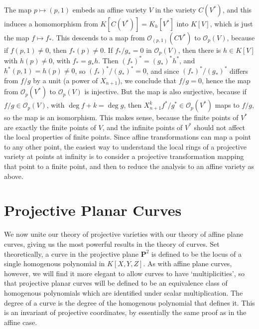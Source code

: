 The map $p \mapsto (p,1)$ embeds an affine variety $V$ in the variety $C(V^*)$, and this induces a homomorphism from $K[C(V^*)] = K_h[V^*]$ into $K[V]$, which is just the map $f \mapsto f_*$. This descends to a map from $\mathcal{O}_{(p,1)}(CV^*)$ to $\mathcal{O}_p(V)$, because if $f(p,1) \neq 0$, then $f_*(p) \neq 0$. If $f_*/g_* = 0$ in $\mathcal{O}_p(V)$, then there is $h \in K[V]$ with $h(p) \neq 0$, with $f_* = g_* h$. Then $(f_*)^* = (g_*)^* h^*$, and $h^*(p,1) = h(p) \neq 0$, so $(f_*)^*/(g_*)^* = 0$, and since $(f_*)^*/(g_*)^*$ differs from $f/g$ by a unit (a power of $X_{n+1}$), we conclude that $f/g = 0$, hence the map from $\mathcal{O}_p(V^*)$ to $\mathcal{O}_p(V)$ is injective. But the map is also surjective, because if $f/g \in \mathcal{O}_p(V)$, with $\deg f + k = \deg g$, then $X_{n+1}^k f^*/g^* \in \mathcal{O}_p(V^*)$ maps to $f/g$, so the map is an isomorphism. This makes sense, because the finite points of $V^*$ are exactly the finite points of $V$, and the infinite points of $V^*$ should not affect the local properties of finite points. Since affine transformations can map a point to any other point, the easiest way to understand the local rings of a projective variety at points at infinity is to consider a projective transformation mapping that point to a finite point, and then to reduce the analysis to an affine variety as above.

\chapter{Projective Planar Curves}

We now unite our theory of projective varieties with our theory of affine plane curves, giving us the most powerful results in the theory of curves. Set theoretically, a curve in the projective plane $\mathbf{P}^2$ is defined to be the locus of a single homogenous polynomial in $K[X,Y,Z]$. As with affine plane curves, however, we will find it more elegant to allow curves to have `multiplicities', so that projective planar curves will be defined to be an equivalence class of homogenous polynomials which are identified under scalar multiplication. The degree of a curve is the degree of the homogenous polynomial that defines it. This is an invariant of projective coordinates, by essentially the same proof as in the affine case.

